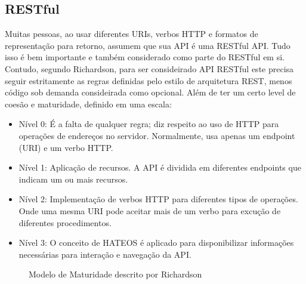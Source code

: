 \subsection[RESTful]{RESTful}

Muitas pessoas, ao usar diferentes URIs, verbos HTTP e formatos de representação para retorno, assumem que sua API é uma RESTful API. Tudo isso é bem importante e também considerado como parte do RESTful em si. Contudo, segundo Richardson, para ser consideirado API RESTful este precisa seguir estritamente as regras definidas pelo estilo de arquitetura REST, menos código sob demanda consideirada como opcional. Além de ter um certo level de coesão e maturidade, definido em uma escala: \cite{RichardsonEtAl2013}

\begin{itemize}[noitemsep]
\item Nível 0: É a falta de qualquer regra; diz respeito ao uso de HTTP para operações de endereços no servidor. Normalmente, usa apenas um endpoint (URI) e um verbo HTTP.
\item Nível 1: Aplicação de recursos. A API é dividida em diferentes endpoints que indicam um ou mais recursos.
\item Nível 2: Implementação de verbos HTTP para diferentes tipos de operações. Onde uma mesma URI pode aceitar mais de um verbo para excução de diferentes procedimentos.
\item Nível 3: O conceito de HATEOS é aplicado para disponibilizar informações necessárias para interação e navegação da API.
\end{itemize}

\begin{figure}[H]
  \centering
  \caption{Modelo de Maturidade descrito por Richardson}
\end{figure}
